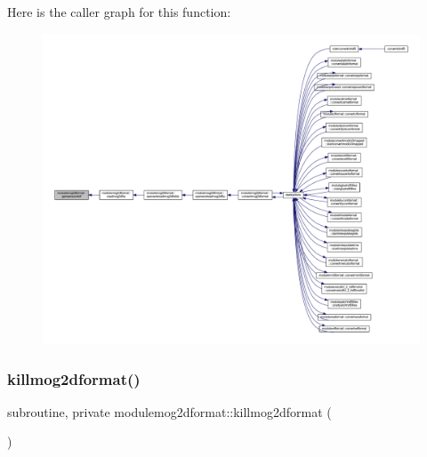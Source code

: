 Here is the caller graph for this function\+:\nopagebreak
\begin{figure}[H]
\begin{center}
\leavevmode
\includegraphics[width=350pt]{namespacemodulemog2dformat_af9424852561b70ff9a6dd1f247d73c37_icgraph}
\end{center}
\end{figure}
\mbox{\label{namespacemodulemog2dformat_ad23545e02e1d7e1b08d7f23fc6220308}} 
\subsubsection{\texorpdfstring{killmog2dformat()}{killmog2dformat()}}
{\footnotesize\ttfamily subroutine, private modulemog2dformat\+::killmog2dformat (\begin{DoxyParamCaption}{ }\end{DoxyParamCaption})\hspace{0.3cm}{\ttfamily [private]}}

